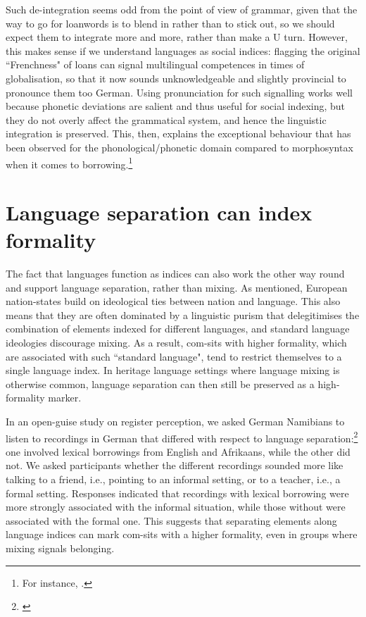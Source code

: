 Such de-integration seems odd from the point of view of grammar, given that the way to go for loanwords is to blend in rather than to stick out, so we should expect them to integrate more and more, rather than make a U turn. However, this makes sense if we understand languages as social indices: flagging the original “Frenchness" of loans can signal multilingual competences in times of globalisation, so that it now sounds unknowledgeable and slightly provincial to pronounce them too German. Using pronunciation for such signalling works well because phonetic deviations are salient and thus useful for social indexing, but they do not overly affect the grammatical system, and hence the linguistic integration is preserved. This, then, explains the exceptional behaviour that has been observed for the phonological/phonetic domain compared to morphosyntax when it comes to borrowing.\footnote{For instance, \citet{Poplack2018}.}

\section{Language separation can index formality}
\hypertarget{Toc125444666}{}
The fact that languages function as indices can also work the other way round and support language separation, rather than mixing. As mentioned, European nation-states build on ideological ties between nation and language. This also means that they are often dominated by a linguistic purism that delegitimises the combination of elements indexed for different languages, and standard language ideologies discourage mixing. As a result, com-sits with higher formality, which are associated with such “standard language", tend to restrict themselves to a single language index. In heritage language settings where language mixing is otherwise common, language separation can then still be preserved as a high-formality marker.

In an open-guise study on register perception, we asked German Namibians to listen to recordings in German that differed with respect to language separation:\footnote{\citet{WieseEtAl2021}} one involved lexical borrowings from English and Afrikaans, while the other did not. We asked participants whether the different recordings sounded more like talking to a friend, i.e., pointing to an informal setting, or to a teacher, i.e., a formal setting. Responses indicated that recordings with lexical borrowing were more strongly associated with the informal situation, while those without were associated with the formal one. This suggests that separating elements along language indices can mark com-sits with a higher formality, even in groups where mixing signals belonging.

